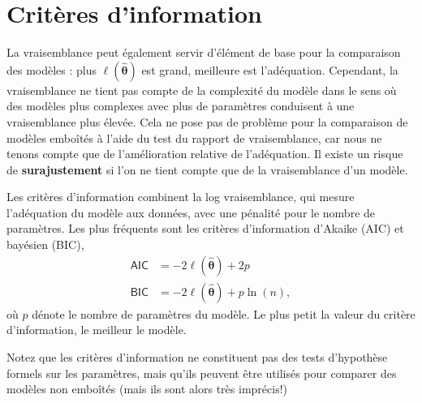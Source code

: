 \documentclass[
  11pt,
  letterpaper,
]{scrbook}
\theoremstyle{definition}
\theoremstyle{plain}
\theoremstyle{definition}
\theoremstyle{plain}
\theoremstyle{remark}
\begin{document}
\section{Critères d'information}\label{crituxe8res-dinformation}

La vraisemblance peut également servir d'élément de base pour la
comparaison des modèles : plus \(\ell(\boldsymbol{\widehat{\theta}})\)
est grand, meilleure est l'adéquation. Cependant, la vraisemblance ne
tient pas compte de la complexité du modèle dans le sens où des modèles
plus complexes avec plus de paramètres conduisent à une vraisemblance
plus élevée. Cela ne pose pas de problème pour la comparaison de modèles
emboîtés à l'aide du test du rapport de vraisemblance, car nous ne
tenons compte que de l'amélioration relative de l'adéquation. Il existe
un risque de \textbf{surajustement} si l'on ne tient compte que de la
vraisemblance d'un modèle.

Les critères d'information combinent la log vraisemblance, qui mesure
l'adéquation du modèle aux données, avec une pénalité pour le nombre de
paramètres. Les plus fréquents sont les critères d'information d'Akaike
(AIC) et bayésien (BIC), \begin{align*}
\mathsf{AIC}&=-2\ell(\widehat{\boldsymbol{\theta}})+2p \\
\mathsf{BIC}&=-2\ell(\widehat{\boldsymbol{\theta}})+p\ln(n),
\end{align*} où \(p\) dénote le nombre de paramètres du modèle. Le plus
petit la valeur du critère d'information, le meilleur le modèle.

Notez que les critères d'information ne constituent pas des tests
d'hypothèse formels sur les paramètres, mais qu'ils peuvent être
utilisés pour comparer des modèles non emboîtés (mais ils sont alors
très imprécis!)
\end{document}
